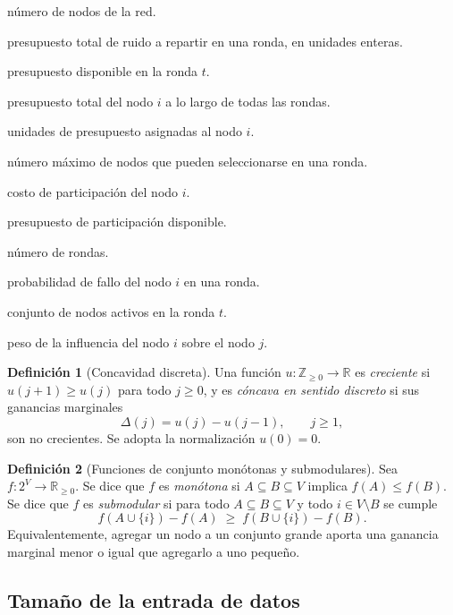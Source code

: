 \documentclass[11pt,a4paper]{article}
\theoremstyle{definition}
\newtheorem{definicion}{Definición}[section]
\theoremstyle{plain}
\newcommand{\Z}{\mathbb{Z}}
\newcommand{\R}{\mathbb{R}}
\begin{document}
\begin{description}[leftmargin=*,style=nextline]
  \item[$N$] número de nodos de la red.
  \item[$B$] presupuesto total de ruido a repartir en una ronda, en unidades
  enteras.
  \item[$B_t$] presupuesto disponible en la ronda $t$.
  \item[$P_i$] presupuesto total del nodo $i$ a lo largo de todas las rondas.
  \item[$x_i$] unidades de presupuesto asignadas al nodo $i$.
  \item[$k$] número máximo de nodos que pueden seleccionarse en una ronda.
  \item[$c_i$] costo de participación del nodo $i$.
  \item[$C$] presupuesto de participación disponible.
  \item[$T$] número de rondas.
  \item[$q_i$] probabilidad de fallo del nodo $i$ en una ronda.
  \item[$A_t$] conjunto de nodos activos en la ronda $t$.
  \item[$w_{ij}$] peso de la influencia del nodo $i$ sobre el nodo $j$.
\end{description}

\begin{definicion}[Concavidad discreta]
Una función $u:\Z_{\ge0}\to\R$ es \emph{creciente} si
$u(j+1)\ge u(j)$ para todo $j\ge0$, y es \emph{cóncava en sentido discreto}
si sus ganancias marginales
\[
  \Delta(j)=u(j)-u(j-1),\qquad j\ge1,
\]
son no crecientes. Se adopta la normalización $u(0)=0$.
\end{definicion}

\begin{definicion}[Funciones de conjunto monótonas y submodulares]
Sea $f:2^V\to\R_{\ge0}$. Se dice que $f$ es \emph{monótona} si
$A\subseteq B\subseteq V$ implica $f(A)\le f(B)$. Se dice que $f$ es
\emph{submodular} si para todo $A\subseteq B\subseteq V$ y todo
$i\in V\setminus B$ se cumple
\[
  f(A\cup\{i\})-f(A)\;\ge\; f(B\cup\{i\})-f(B).
\]
Equivalentemente, agregar un nodo a un conjunto grande aporta una ganancia
marginal menor o igual que agregarlo a uno pequeño.
\end{definicion}

\subsection{Tamaño de la entrada de datos}
\end{document}
